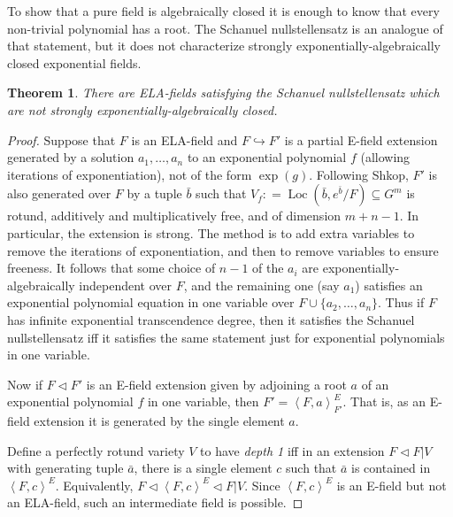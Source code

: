 \documentclass[12pt]{amsart}
\newtheorem{theorem}[prop]{Theorem}
\theoremstyle{definition}
\begin{document}
To show that a pure field is algebraically closed it is enough to know that every non-trivial polynomial has a root. The Schanuel nullstellensatz is an analogue of that statement, but it does not characterize strongly exponentially-algebraically closed exponential fields. 
\begin{theorem}
There are ELA-fields satisfying the Schanuel nullstellensatz which are not {strongly exponentially-algebraically closed}.
\end{theorem}
\begin{proof}
Suppose that $F$ is an ELA-field and $F {\hookrightarrow} F'$ is a partial E-field extension generated by a solution $a_1,\ldots,a_n$ to an exponential polynomial $f$ (allowing iterations of exponentiation), not of the form $\exp(g)$. Following Shkop, $F'$ is also generated over $F$ by a tuple ${{\ensuremath{\bar{b}}}}$ such that $V_f {\mathrel{\mathop:}=} \operatorname{Loc}({{\ensuremath{\bar{b}}}},e^{{\ensuremath{\bar{b}}}}/F) {\subseteq} G^m$ is rotund, additively and multiplicatively free, and of dimension $m+n-1$. In particular, the extension is strong. The method is to add extra variables to remove the iterations of exponentiation, and then to remove variables to ensure freeness. It follows that some choice of $n-1$ of the $a_i$ are exponentially-algebraically independent over $F$, and the remaining one (say $a_1$) satisfies an exponential polynomial equation in one variable over $F \cup \{a_2,\ldots,a_n\}$. Thus if $F$ has infinite exponential transcendence degree, then it satisfies the Schanuel nullstellensatz iff it satisfies the same statement just for exponential polynomials in one variable.

Now if $F {\ensuremath{\lhd}} F'$ is an E-field extension given by adjoining a root $a$ of an exponential polynomial $f$ in one variable, then $F' = {\ensuremath{\left\langle {F,a} \right\rangle}}^E_{F'}$. That is, as an E-field extension it is generated by the single element $a$. 

Define a perfectly rotund variety $V$ to have \emph{depth 1} iff in an extension $F {\ensuremath{\lhd}} F|V$ with generating tuple ${{\ensuremath{\bar{a}}}}$, there is a single element $c$ such that ${{\ensuremath{\bar{a}}}}$ is contained in ${\ensuremath{\left\langle {F,c} \right\rangle}}^E$. Equivalently, $F {\ensuremath{\lhd}} {\ensuremath{\left\langle {F,c} \right\rangle}}^E {\ensuremath{\lhd}} F|V$. Since ${\ensuremath{\left\langle {F,c} \right\rangle}}^E$ is an E-field but not an ELA-field, such an intermediate field is possible.


\end{proof}
\end{document}
